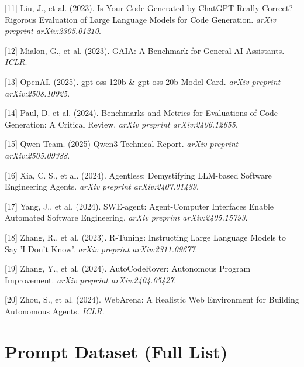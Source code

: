 \documentclass{article}
\begin{document}
[11] Liu, J., et al. (2023). Is Your Code Generated by ChatGPT Really Correct? Rigorous Evaluation of Large Language Models for Code Generation. \textit{arXiv preprint arXiv:2305.01210}.

[12] Mialon, G., et al. (2023). GAIA: A Benchmark for General AI Assistants. \textit{ICLR}.

[13] OpenAI. (2025). gpt-oss-120b \& gpt-oss-20b Model Card. \textit{arXiv preprint arXiv:2508.10925}.

[14] Paul, D. et al. (2024). Benchmarks and Metrics for Evaluations of Code Generation: A Critical Review. \textit{arXiv preprint arXiv:2406.12655}.

[15] Qwen Team. (2025) Qwen3 Technical Report. \textit{arXiv preprint arXiv:2505.09388}.

[16] Xia, C. S., et al. (2024). Agentless: Demystifying LLM-based Software Engineering Agents. \textit{arXiv preprint arXiv:2407.01489}.

[17] Yang, J., et al. (2024). SWE-agent: Agent-Computer Interfaces Enable Automated Software Engineering. \textit{arXiv preprint arXiv:2405.15793}.

[18] Zhang, R., et al. (2023). R-Tuning: Instructing Large Language Models to Say 'I Don't Know'. \textit{arXiv preprint arXiv:2311.09677}.

[19] Zhang, Y., et al. (2024). AutoCodeRover: Autonomous Program Improvement. \textit{arXiv preprint arXiv:2404.05427}.

[20] Zhou, S., et al. (2024). WebArena: A Realistic Web Environment for Building Autonomous Agents. \textit{ICLR}.


\appendix

\section{Prompt Dataset (Full List)}
\end{document}
